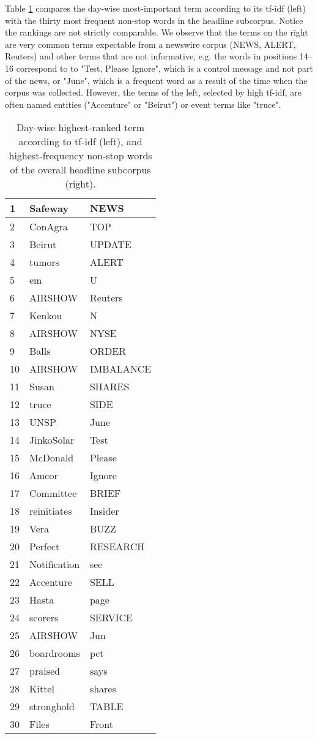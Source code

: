 \documentclass[12pt]{article}%
\begin{document}
Table \ref{tbl:tfidf} compares the day-wise most-important term according to its tf-idf (left) with the thirty most frequent non-stop words in the headline subcorpus. Notice the rankings are not strictly comparable. We observe that the terms on the right are very common terms expectable from a newswire corpus (NEWS, ALERT, Reuters) and other terms that are not informative, e.g. the words in positions 14--16 correspond to to "Test, Please Ignore", which is a control message and not part of the news, or "June", which is a frequent word as a result of the time when the corpus was collected. However, the terms of the left, selected by high tf-idf, are often named entities ("Accenture" or "Beirut") or event terms like "truce".
\begin{table}
\center
\begin{tabular}{|ll|l|}
\hline 
1 & Safeway & NEWS \\ \hline
2 & ConAgra & TOP \\ \hline
3 & Beirut & UPDATE \\ \hline
4 & tumors & ALERT \\ \hline
5 & em & U \\ \hline
6 & AIRSHOW & Reuters \\ \hline
7 & Kenkou & N \\ \hline
8 & AIRSHOW & NYSE \\ \hline
9 & Balls & ORDER \\ \hline
10 & AIRSHOW & IMBALANCE \\ \hline
11 & Susan & SHARES \\ \hline
12 & truce & SIDE \\ \hline
13 & UNSP & June \\ \hline
14 & JinkoSolar & Test \\ \hline
15 & McDonald & Please \\ \hline
16 & Amcor & Ignore \\ \hline
17 & Committee & BRIEF \\ \hline
18 & reinitiates & Insider \\ \hline
19 & Vera & BUZZ \\ \hline
20 & Perfect & RESEARCH \\ \hline
21 & Notification & see \\ \hline
22 & Accenture & SELL \\ \hline
23 & Hasta & page \\ \hline
24 & scorers & SERVICE \\ \hline
25 & AIRSHOW & Jun \\ \hline
26 & boardrooms & pct \\ \hline
27 & praised & says \\ \hline
28 & Kittel & shares \\ \hline
29 & stronghold & TABLE \\ \hline
30 & Files & Front \\ \hline
\hline 

\end{tabular} 
\caption {Day-wise highest-ranked term according to tf-idf (left), and highest-frequency non-stop words of the overall headline subcorpus (right).\label{tbl:tfidf}}
\end{table}
\end{document}
